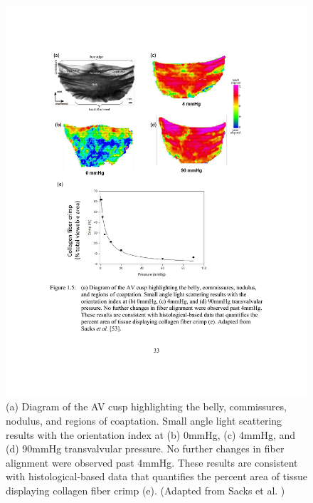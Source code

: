     
\begin{figure}
\centering
\includegraphics[width=\textwidth]{Images/chapter1/salsaortic.pdf}
\caption{(a) Diagram of the AV cusp highlighting the belly, commissures, nodulus, and regions of coaptation. Small angle light scattering results with the orientation index at (b) 0mmHg, (c) 4mmHg, and (d) 90mmHg transvalvular pressure. No further changes in fiber alignment were observed past 4mmHg. These results are consistent with histological-based data that quantifies the percent area of tissue displaying collagen fiber crimp (e). (Adapted from Sacks et al. \cite{sacks_aortic_1998})}
\label{c1:fig:salsaortic}
\end{figure}

